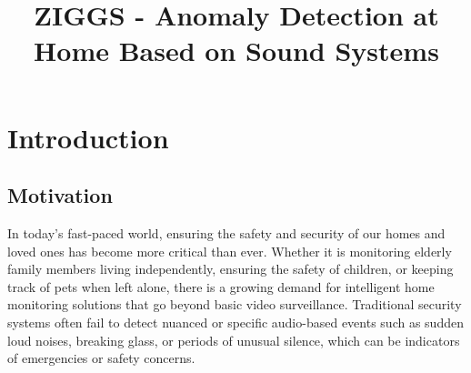 \documentclass[conference]{IEEEtran}
\begin{document}
\title{ZIGGS - Anomaly Detection at Home Based on Sound Systems}
\author{
\and
{}
\and
{}
\and
}




\maketitle

\section{Introduction}
\subsection{Motivation}
In today’s fast-paced world, ensuring the safety and security of our homes and loved ones has become more critical than ever. Whether it is monitoring elderly family members living independently, ensuring the safety of children, or keeping track of pets when left alone, there is a growing demand for intelligent home monitoring solutions that go beyond basic video surveillance. Traditional security systems often fail to detect nuanced or specific audio-based events such as sudden loud noises, breaking glass, or periods of unusual silence, which can be indicators of emergencies or safety concerns.
\end{document}
